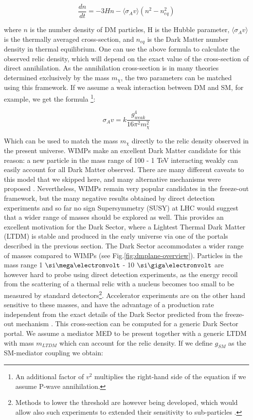   \begin{equation}
    \label{eq:boltzman-equation}
    \frac{d n}{d t} = -3 H n - \langle \sigma_A v \rangle (n^2 - n^2_{eq})
  \end{equation}

  where $n$ is the number density of DM particles, H is the Hubble parameter,  $\langle \sigma_A v \rangle$ is the thermally averaged cross-section, and $n_{eq}$ is the Dark Matter number density in thermal equilibrium. One can use the above formula to calculate the observed relic density, which will depend on the exact value of the cross-section of direct annihilation. As the annihilation cross-section is in many theories determined exclusively by the mass $m_{\chi}$, the two parameters can be matched using this framework. If we assume a weak interaction between DM and SM, for example, we get the formula \cite{Feng:2010gw}\footnote{An additional factor of $v^2$ multiplies the right-hand side of the equation if we assume P-wave annihilation.}:

  \begin{equation}
    \label{eq:dm-fo-sigma}
    \sigma_A v = k \frac{g^4_{weak}}{16 \pi^2 m^2_{\chi}}
  \end{equation}

  Which can be used to match the mass $m_{\chi}$ directly to the relic density observed in the present universe. WIMPs make an excellent Dark Matter candidate for this reason: a new particle in the mass range of 100 \gev - 1 \si{\tera\electronvolt} interacting weakly can easily account for all Dark Matter observed. There are many different caveats to this model that we skipped here, and many alternative mechanisms were proposed \cite{Hall:2009bx,Feng:2010gw,Marsh:2015xka,Griest:1990kh,Arcadi:2017kky}. Nevertheless, WIMPs remain very popular candidates in the freeze-out framework, but the many negative results obtained by direct detection experiments and so far no sign Supersymmetry (SUSY) at LHC would suggest that a wider range of masses should be explored as well. This provides an excellent motivation for the Dark Sector, where a Lightest Thermal Dark Matter (LTDM) is stable and produced in the early universe via one of the portals described in the previous section. The Dark Sector accommodates a wider range of masses compared to WIMPs (see Fig.\ref{fig:dmplane-overview}). Particles in the mass range 1 $\mev$ - 10 $\gev$ are however hard to probe using direct detection experiments, as the energy recoil from the scattering of a thermal relic with a nucleus becomes too small to be measured by standard detectors\footnote{Methods to lower the threshold are however being developed, which would allow also such experiments to extended their sensitivity to sub-\gev particles \cite{Baracchini:2020nut}.}. Accelerator experiments are on the other hand sensitive to these masses, and have the advantage of a production rate independent from the exact details of the Dark Sector predicted from the freeze-out mechanism \cite{battaglieri2017cosmic}. This cross-section can be computed for a generic Dark Sector portal. We assume a mediator MED to be present together with a generic LTDM with mass $m_{LTDM}$ which can account for the relic density. If we define $g_{SM}$ as the SM-mediator coupling we obtain:

